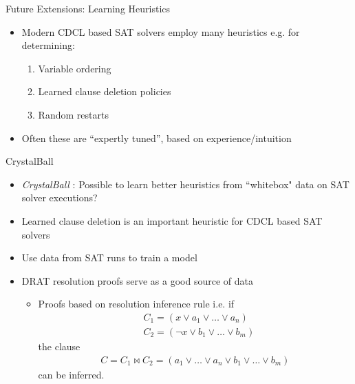 \documentclass{beamer}
\begin{document}

\begin{frame}{Future Extensions: Learning Heuristics}
    \begin{itemize}
        \item Modern CDCL based SAT solvers employ many heuristics e.g. for determining:
            \begin{enumerate}
                \item Variable ordering
                \item Learned clause deletion policies
                \item Random restarts
            \end{enumerate}
        \item Often these are ``expertly tuned'', based on experience/intuition
    \end{itemize}
\end{frame}

\begin{frame}{CrystalBall}
    \begin{itemize}[<+->]
        \item \textit{CrystalBall} \cite{2019sooscrystalball}: Possible to learn better heuristics from ``whitebox" data on SAT solver executions? 
        \item Learned clause deletion is an important heuristic for CDCL based SAT solvers
        \item Use data from SAT runs to train a model
        \item DRAT resolution proofs serve as a good source of data
        \pause
        \begin{itemize}
            \item Proofs based on resolution inference rule i.e. if
            \begin{align*}
                &C_1 = (x \vee a_1 \vee \dots \vee a_n) \\
                &C_2 = (\neg{x} \vee b_1 \vee \dots \vee b_m)
            \end{align*}
            the clause 
            \begin{align*}
                C = C_1 \bowtie C_2 = (a_1 \vee \dots \vee a_n \vee b_1 \vee \dots \vee b_m)
            \end{align*}
            can be inferred.
        \end{itemize}
    \end{itemize}
\end{frame}
\end{document}
